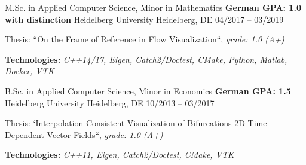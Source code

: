 \begin{cventries}
  \cventry
    {M.Sc. in Applied Computer Science, Minor in Mathematics {\enskip\cdotp\enskip} \textbf{German GPA: 1.0 with distinction}}
    {Heidelberg University}
    {Heidelberg, DE}
    {04/2017 -- 03/2019}
    {
      \begin{cvitems}
        \item {Thesis: ``On the Frame of Reference in Flow Visualization``, \textit{grade: 1.0 (A+)}}
        \item {\textbf{Technologies:} \textit{C++14/17, Eigen, Catch2/Doctest, CMake, Python, Matlab, Docker, VTK}}
      \end{cvitems}
    }
  \cventry
    {B.Sc. in Applied Computer Science, Minor in Economics {\enskip\cdotp\enskip} \textbf{German GPA: 1.5}}
    {Heidelberg University}
    {Heidelberg, DE}
    {10/2013 -- 03/2017}
    {
      \begin{cvitems}
        \item {Thesis: `Interpolation-Consistent Visualization of Bifurcations 2D Time-Dependent Vector Fields``, \textit{grade: 1.0 (A+)}}
        \item {\textbf{Technologies:} \textit{C++11, Eigen, Catch2/Doctest, CMake, VTK}}
      \end{cvitems}
    }
\end{cventries}
